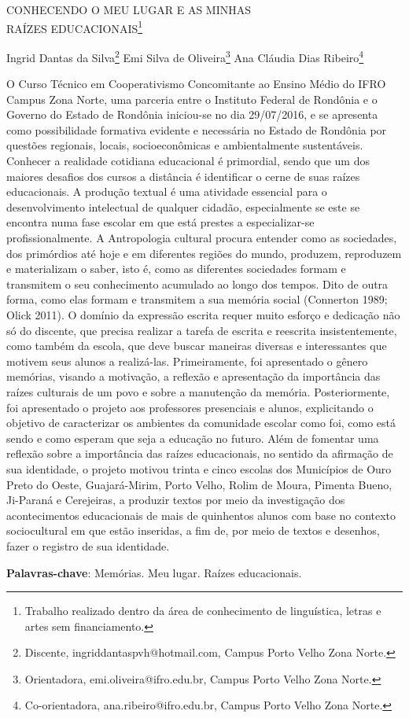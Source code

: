 \documentclass[article,12pt,onesidea,4paper,english,brazil]{abntex2}
\begin{document}
	
	
	\frenchspacing 
	
	\begin{center}
		\LARGE CONHECENDO O MEU LUGAR E AS MINHAS\\RAÍZES EDUCACIONAIS\footnote{Trabalho realizado dentro da área de conhecimento de linguística, letras e artes sem financiamento.}
		
		\normalsize
		Ingrid Dantas da Silva\footnote{Discente, ingriddantaspvh@hotmail.com, Campus Porto Velho Zona Norte.} 
		Emi Silva de Oliveira\footnote{Orientadora, emi.oliveira@ifro.edu.br, Campus Porto Velho Zona Norte.} 
	Ana Cláudia Dias Ribeiro\footnote{Co-orientadora, ana.ribeiro@ifro.edu.br, Campus Porto Velho Zona Norte.} 
	\end{center}
	
	\noindent O Curso Técnico em Cooperativismo Concomitante ao Ensino Médio do IFRO Campus Zona Norte,
	uma parceria entre o Instituto Federal de Rondônia e o Governo do Estado de Rondônia iniciou-se no
	dia 29/07/2016, e se apresenta como possibilidade formativa evidente e necessária no Estado de
	Rondônia por questões regionais, locais, socioeconômicas e ambientalmente sustentáveis. Conhecer
	a realidade cotidiana educacional é primordial, sendo que um dos maiores desafios dos cursos a
	distância é identificar o cerne de suas raízes educacionais. A produção textual é uma atividade
	essencial para o desenvolvimento intelectual de qualquer cidadão, especialmente se este se encontra
	numa fase escolar em que está prestes a especializar-se profissionalmente. A Antropologia cultural
	procura entender como as sociedades, dos primórdios até hoje e em diferentes regiões do mundo,
	produzem, reproduzem e materializam o saber, isto é, como as diferentes sociedades formam e
	transmitem o seu conhecimento acumulado ao longo dos tempos. Dito de outra forma, como elas
	formam e transmitem a sua memória social (Connerton 1989; Olick 2011). O domínio da expressão
	escrita requer muito esforço e dedicação não só do discente, que precisa realizar a tarefa de escrita e
	reescrita insistentemente, como também da escola, que deve buscar maneiras diversas e
	interessantes que motivem seus alunos a realizá-las. Primeiramente, foi apresentado o gênero
	memórias, visando a motivação, a reflexão e apresentação da importância das raízes culturais de um
	povo e sobre a manutenção da memória. Posteriormente, foi apresentado o projeto aos professores
	presenciais e alunos, explicitando o objetivo de caracterizar os ambientes da comunidade escolar
	como foi, como está sendo e como esperam que seja a educação no futuro. Além de fomentar uma
	reflexão sobre a importância das raízes educacionais, no sentido da afirmação de sua identidade, o
	projeto motivou trinta e cinco escolas dos Municípios de Ouro Preto do Oeste, Guajará-Mirim, Porto
	Velho, Rolim de Moura, Pimenta Bueno, Ji-Paraná e Cerejeiras, a produzir textos por meio da
	investigação dos acontecimentos educacionais de mais de quinhentos alunos com base no contexto
	sociocultural em que estão inseridas, a fim de, por meio de textos e desenhos, fazer o registro de sua
	identidade.
	
	\vspace{\onelineskip}
	
	\noindent
	\textbf{Palavras-chave}: Memórias. Meu lugar. Raízes educacionais.
	
\end{document}
